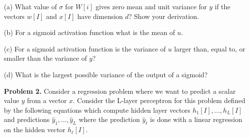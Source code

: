 \documentclass{article}
\newcommand{\solution}[1]{}
\begin{document}
\medskip
(a) What value of $\sigma$ for $W[i]$ gives zero mean and unit variance for $y$ if the vectors $w[I]$ and $x[I]$ have dimension $d$?  Show your derivation.

\solution{Let $\sigma^2$ be the variance of $x[i]$.  We then have that the variance of $\sum_i W[i]x[i]$ is $\sum_i \sigma^2 = d \sigma^2$.
  Setting $d\sigma^2$ equal to 1 gives
  $$\sigma = \frac{1}{\sqrt{d}}$$
}


\medskip
(b) For a sigmoid activation function what is the mean of $u$.

\solution{
  We are given that the probability that $W[i] = z$ is the same as the probability of $w[i]= -z$.  This implies that for a given value of
  $x[i]$ we have that the probability that $w[i]x[i] = z$ equals the probability that $w[i]x[i] = -z$.  This further implies that, for a given value $y$, the
  probability that $\sum_i w[i]z[i] = y$ equals the probability that $\sum_i w[i]x[i] = -y$.  So the input to the sigmoid is distributed symmetrically about 0.
  Since the sigmoid function is itself symmetric about 0, we get that the expected value of the output of the sigmoid is its value at zero which is 1/2.
}

\medskip
(c) For a sigmoid activation function
is the variance of $u$ larger than, equal to, or smaller than the variance of $y$?

\solution{
  The variance is smaller.  To show this it suffices to show that the slope of the sigmoid function is everywhere less than 1.  The slope is largest at the input zero.
  The sigmoid function is
  $$f(z) = \frac{1}{1 + e^{-y}}$$
  The slope is
  $$f'(y) = \frac{e^{-y}}{(1+e^{-y})^2}$$
  which equals $1/4$ at $y = 0$.
}

\medskip
(d) What is the largest possible variance of the output of a sigmoid?

\solution{
  The larest valriance occurs when $y = \infty$ with probability 1/2 and $y = -\infty$ with probability 1/2 ;-).  Tn this case $f(y)$ is 0 with probability 1/2 and 1 with probability 1/2.
  Which gives a variance of 1/4.
}

\bigskip
{\bf Problem 2.}  Consider a regression problem where we want to predict a scalar value $y$ from a vector $x$.
Consider the L-layer perceptron for this problem defined by the following equations
which compute hidden layer vectors $h_1[I], \ldots, h_L[I]$ and predictions $\hat{y}_1, \ldots, \hat{y}_L$ where
the prediction $\hat{y}_\ell$ is done with a linear regression on the hidden vector $h_\ell[I]$.
\end{document}
